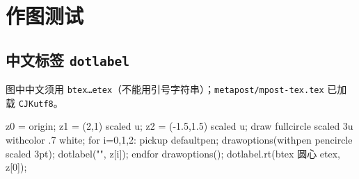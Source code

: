 \chapter{作图测试}

\section{中文标签 \texttt{dotlabel}}

图中中文须用 \texttt{btex\ldots etex}（不能用引号字符串）；\texttt{metapost/mpost-tex.tex} 已加载 \texttt{CJKutf8}。

\begin{mpostfig}[label=labels-cn-demo,show]
  z0 = origin;
  z1 = (2,1) scaled u;
  z2 = (-1.5,1.5) scaled u;
  draw fullcircle scaled 3u withcolor .7 white;
  for i=0,1,2:
    pickup defaultpen;
    drawoptions(withpen pencircle scaled 3pt);
    dotlabel("", z[i]);
  endfor
  drawoptions();
  dotlabel.rt(btex 圆心 etex, z[0]);
\end{mpostfig}